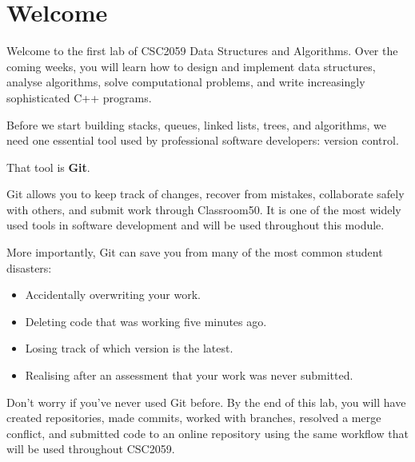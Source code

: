 \documentclass{csc2059practical}
\begin{document}
\maketitle
\tableofcontents
\clearpage
\section{Welcome}
Welcome to the first lab of CSC2059 Data Structures and Algorithms. Over the coming weeks, you will learn how to design and implement data structures, analyse algorithms, solve computational problems, and write increasingly sophisticated C++ programs.

Before we start building stacks, queues, linked lists, trees, and algorithms, we need one essential tool used by professional software developers: version control.

That tool is \textbf{Git}.

Git allows you to keep track of changes, recover from mistakes, collaborate safely with others, and submit work through Classroom50. It is one of the most widely used tools in software development and will be used throughout this module.

More importantly, Git can save you from many of the most common student disasters:

\begin{itemize}
  \item Accidentally overwriting your work.
  \item Deleting code that was working five minutes ago.
  \item Losing track of which version is the latest.
  \item Realising after an assessment that your work was never submitted.
\end{itemize}
Don't worry if you've never used Git before. By the end of this lab, you will have created repositories, made commits, worked with branches, resolved a merge conflict, and submitted code to an online repository using the same workflow that will be used throughout CSC2059.
\end{document}
